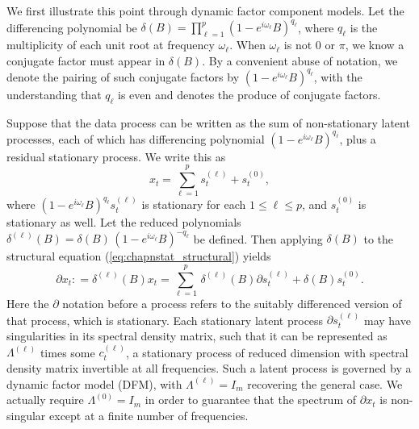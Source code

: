 \documentclass[a4paper]{book}
\begin{document}
 We first illustrate this point through dynamic factor component models.  Let
 the differencing polynomial be $\delta (B) = \prod_{\ell=1}^p {(1 -
 e^{i \omega_{\ell}} B )}^{q_{\ell}}$, where $q_{\ell}$ is the
 multiplicity of each unit root at frequency $\omega_{\ell}$.  When $\omega_{\ell}$ is not $0$ or $\pi$,
 we know a conjugate factor must appear in $\delta (B)$.  By a convenient abuse of notation, we denote
the pairing of such conjugate factors by ${(1 - e^{i \omega_{\ell} } B)}^{q_{\ell}}$, with the understanding that
 $q_{\ell} $ is even and denotes the produce of conjugate factors.

Suppose that the data process can be written as the sum of
 non-stationary latent processes, each of which has differencing
 polynomial ${(1 - e^{i \omega_{\ell}} B )}^{q_{\ell}}$, plus a
 residual stationary process.  We write this as
\begin{equation}
 \label{eq:chapnstat_structural}
 x_t = \sum_{\ell=1}^p s^{(\ell)}_t + s^{(0)}_t,
\end{equation}
 where ${(1 - e^{i \omega_{\ell}} B )}^{q_{\ell}} s^{(\ell)}_t$ is
 stationary for each $1 \leq \ell \leq p$, and $s^{(0)}_t$ is
 stationary as well.  Let the
 reduced polynomials $\delta^{(\ell)} (B) = \delta (B) \, {(1 -
 e^{i \omega_{\ell}} B )}^{-q_{\ell}}$ be defined.  Then applying
 $\delta (B)$ to the structural equation (\ref{eq:chapnstat_structural}) yields
\[
 \partial x_t  : = \delta^{(\ell)} (B) x_t = \sum_{\ell=1}^p \, \delta^{(\ell)} (B) \partial
 s^{(\ell)}_t + \delta (B) s^{(0)}_t.
\]
 Here the $\partial$ notation before a process refers to the
 suitably differenced version of that process, which is stationary.
  Each stationary latent process $\partial s^{(\ell)}_t$ may have
  singularities in its spectral density matrix, such that it can be
  represented as $\Lambda^{(\ell)}$ times some $c^{(\ell)}_t$, a
 stationary process of reduced dimension with spectral density
 matrix invertible at all frequencies.  Such a latent process is
 governed by a dynamic factor model (DFM), with $\Lambda^{(\ell)} =
 I_m$ recovering the general case.  We actually require
 $\Lambda^{(0)} = I_m$ in order to guarantee that the spectrum of
 $\partial x_t$ is non-singular except at a finite number of
 frequencies.
\end{document}
